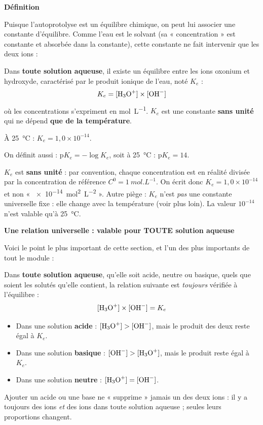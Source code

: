 \documentclass[11pt]{article}
\newcommand{\cle}[1]{{\popxbold\color{popdark}#1}}
\newcounter{popsec}
\newcounter{popsub}
\newcommand{\courssub}[1]{%
  \stepcounter{popsub}%
  \par\vspace{9pt}\noindent{\popxbold\fontsize{11.5}{13}\selectfont\color{popink}{\color{poporange}\thepopsec.\thepopsub}\hspace{6pt}#1}\par\nopagebreak\vspace{4pt}
}
\begin{document}
\courssub{Le produit ionique de l'eau \texorpdfstring{$K_e$}{Ke}}

\textbf{Définition}\par

Puisque l'autoprotolyse est un équilibre chimique, on peut lui associer une \cle{constante d'équilibre}. Comme l'eau est le solvant (sa « concentration » est constante et absorbée dans la constante), cette constante ne fait intervenir que les deux ions :

\begin{definition}
Dans \textbf{toute solution aqueuse}, il existe un équilibre entre les ions oxonium et hydroxyde, caractérisé par le \cle{produit ionique de l'eau}, noté $K_e$ :
\[ K_e = [\ce{H3O+}] \times [\ce{OH-}] \]
où les concentrations s'expriment en \si{mol.L^{-1}}. $K_e$ est une constante \textbf{sans unité} qui ne dépend \textbf{que de la température}.

À \SI{25}{\celsius} : $K_e = 1{,}0 \times 10^{-14}$.

On définit aussi : $\mathrm{p}K_e = -\log K_e$, soit à \SI{25}{\celsius} : $\mathrm{p}K_e = 14$.
\end{definition}

\begin{attention}
$K_e$ est \textbf{sans unité} : par convention, chaque concentration est en réalité divisée par la concentration de référence $C^0 = \SI{1}{mol.L^{-1}}$. On écrit donc $K_e = 1{,}0 \times 10^{-14}$ et non « \SI{e-14}{mol^2.L^{-2}} ». Autre piège : $K_e$ n'est \emph{pas} une constante universelle fixe : elle change avec la température (voir plus loin). La valeur $10^{-14}$ n'est valable qu'à \SI{25}{\celsius}.
\end{attention}

\textbf{Une relation universelle : valable pour TOUTE solution aqueuse}\par

Voici le point le plus important de cette section, et l'un des plus importants de tout le module :

\begin{propriete}
Dans \textbf{toute solution aqueuse}, qu'elle soit acide, neutre ou basique, quels que soient les solutés qu'elle contient, la relation suivante est \emph{toujours} vérifiée à l'équilibre :
\[ [\ce{H3O+}] \times [\ce{OH-}] = K_e \]
\begin{itemize}
\item Dans une solution \textbf{acide} : $[\ce{H3O+}] > [\ce{OH-}]$, mais le produit des deux reste égal à $K_e$.
\item Dans une solution \textbf{basique} : $[\ce{OH-}] > [\ce{H3O+}]$, mais le produit reste égal à $K_e$.
\item Dans une solution \textbf{neutre} : $[\ce{H3O+}] = [\ce{OH-}]$.
\end{itemize}
Ajouter un acide ou une base ne « supprime » jamais un des deux ions : il y a toujours des ions  \emph{et} des ions  dans toute solution aqueuse ; seules leurs proportions changent.
\end{propriete}
\end{document}
